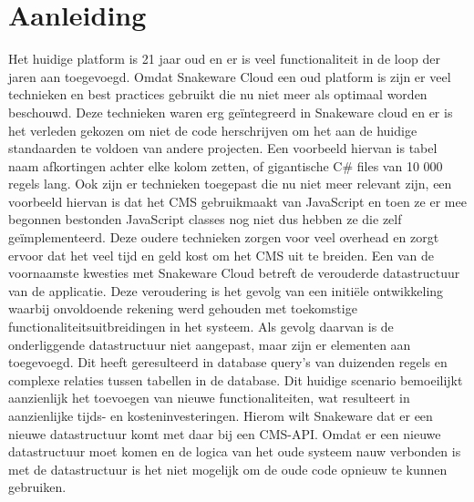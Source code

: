 \section{Aanleiding} 
Het huidige platform is 21 jaar oud en er is veel functionaliteit in de loop der jaren aan toegevoegd.
Omdat Snakeware Cloud een oud platform is zijn er veel technieken en best practices gebruikt die nu niet meer als optimaal worden beschouwd.
Deze technieken waren erg geïntegreerd in Snakeware cloud en er is het verleden gekozen om niet de code herschrijven om het aan de huidige standaarden te voldoen van andere projecten.
Een voorbeeld hiervan is tabel naam afkortingen achter elke kolom zetten, of gigantische C\# files van 10 000 regels lang. 
Ook zijn er technieken toegepast die nu niet meer relevant zijn, een voorbeeld hiervan is dat het \gls{CMS} gebruikmaakt van JavaScript en toen ze er mee begonnen bestonden JavaScript classes nog niet dus hebben ze die zelf geïmplementeerd.
Deze oudere technieken zorgen voor veel overhead en zorgt ervoor dat het veel tijd en geld kost om het CMS uit te breiden.
\whitespace
Een van de voornaamste kwesties met Snakeware Cloud betreft de verouderde datastructuur van de applicatie.
Deze veroudering is het gevolg van een initiële ontwikkeling waarbij onvoldoende rekening werd gehouden met toekomstige functionaliteitsuitbreidingen in het systeem.
Als gevolg daarvan is de onderliggende datastructuur niet aangepast, maar zijn er elementen aan toegevoegd.
Dit heeft geresulteerd in database query's van duizenden regels en complexe relaties tussen tabellen in de database.
Dit huidige scenario bemoeilijkt aanzienlijk het toevoegen van nieuwe functionaliteiten, wat resulteert in aanzienlijke tijds- en kosteninvesteringen.
\whitespace
Hierom wilt Snakeware dat er een nieuwe datastructuur komt met daar bij een \gls{CMS}-API.
Omdat er een nieuwe datastructuur moet komen en de logica van het oude systeem nauw verbonden is met de
datastructuur is het niet mogelijk om de oude code opnieuw te kunnen gebruiken.
